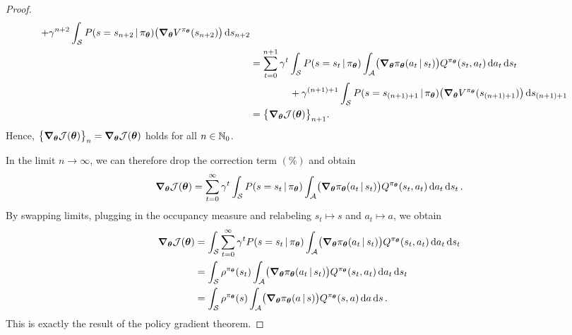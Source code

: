 \begin{proof}
\begin{align}
				+ \gamma^{n + 2} \int_\mathcal{S} P(s = s_{n + 2} \,\vert\, \pi_{\bm{\theta}}) \bigl( \grad_{\bm{\theta}} V^{\pi_{\bm{\theta}}}(s_{n + 2}) \bigr) \dd{s_{n + 2}}                                                                                           \\
				 & = \sum_{t = 0}^{n + 1} \gamma^t \int_{\mathcal{S}} P(s = s_t \,\vert\, \pi_{\bm{\theta}}) \int_{\mathcal{A}} \bigl( \grad_{\bm{\theta}} \pi_{\bm{\theta}}(a_t \,\vert\, s_t) \bigr) Q^{\pi_{\bm{\theta}}}(s_t, a_t) \dd{a_t} \dd{s_t}                     \\&\qquad\qquad
				+ \gamma^{(n + 1) + 1} \int_\mathcal{S} P(s = s_{(n + 1) + 1} \,\vert\, \pi_{\bm{\theta}}) \bigl( \grad_{\bm{\theta}} V^{\pi_{\bm{\theta}}}(s_{(n + 1) + 1}) \bigr) \dd{s_{(n + 1) + 1}}                                                                   \\
				 & = \bigl\{ \grad_{\bm{\theta}} \mathcal{J}(\bm{\theta}) \bigr\}_{n + 1}.
			\end{align}
			Hence, \( \bigl\{ \grad_{\bm{\theta}} \mathcal{J}(\bm{\theta}) \bigr\}_n = \grad_{\bm{\theta}} \mathcal{J}(\bm{\theta}) \) holds for all \(n \in \mathbb{N}_0\).

			In the limit \(n \to \infty\), we can therefore drop the correction term \((\%)\) and obtain
			\begin{equation}
				\grad_{\bm{\theta}} \mathcal{J}(\bm{\theta}) = \sum_{t = 0}^{\infty} \gamma^t \int_{\mathcal{S}} P(s = s_t \,\vert\, \pi_{\bm{\theta}}) \int_{\mathcal{A}} \bigl( \grad_{\bm{\theta}} \pi_{\bm{\theta}}(a_t \,\vert\, s_t) \bigr) Q^{\pi_{\bm{\theta}}}(s_t, a_t) \dd{a_t} \dd{s_t}.
			\end{equation}
			By swapping limits, plugging in the occupancy measure and relabeling \(s_t \mapsto s\) and \(a_t \mapsto a\), we obtain
			\begin{align}
				\grad_{\bm{\theta}} \mathcal{J}(\bm{\theta})
				 & = \int_{\mathcal{S}} \sum_{t = 0}^{\infty} \gamma^t P(s = s_t \,\vert\, \pi_{\bm{\theta}}) \int_{\mathcal{A}} \bigl( \grad_{\bm{\theta}} \pi_{\bm{\theta}}(a_t \,\vert\, s_t) \bigr) Q^{\pi_{\bm{\theta}}}(s_t, a_t) \dd{a_t} \dd{s_t} \\
				 & = \int_{\mathcal{S}} \rho^{\pi_{\bm{\theta}}}(s_t) \int_{\mathcal{A}} \bigl( \grad_{\bm{\theta}} \pi_{\bm{\theta}}(a_t \,\vert\, s_t) \bigr) Q^{\pi_{\bm{\theta}}}(s_t, a_t) \dd{a_t} \dd{s_t}                                      \\
				 & = \int_{\mathcal{S}} \rho^{\pi_{\bm{\theta}}}(s) \int_{\mathcal{A}} \bigl( \grad_{\bm{\theta}} \pi_{\bm{\theta}}(a \,\vert\, s) \bigr) Q^{\pi_{\bm{\theta}}}(s, a) \dd{a} \dd{s}.
			\end{align}
			This is exactly the result of the policy gradient theorem.
		\end{proof}
